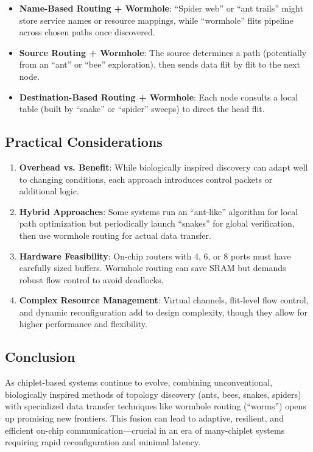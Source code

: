 \documentclass[../OAE-SPEC-MAIN.tex]{subfiles}
\begin{document}
\begin{itemize}
    \item \textbf{Name-Based Routing + Wormhole}: “Spider web” or “ant trails” might store service names or resource mappings, while “wormhole” flits pipeline across chosen paths once discovered.
    \item \textbf{Source Routing + Wormhole}: The source determines a path (potentially from an “ant” or “bee” exploration), then sends data flit by flit to the next node.
    \item \textbf{Destination-Based Routing + Wormhole}: Each node consults a local table (built by “snake” or “spider” sweeps) to direct the head flit.
\end{itemize}

\subsection*{Practical Considerations}
\begin{enumerate}
    \item \textbf{Overhead vs. Benefit}: While biologically inspired discovery can adapt well to changing conditions, each approach introduces control packets or additional logic.
    \item \textbf{Hybrid Approaches}: Some systems run an “ant-like” algorithm for local path optimization but periodically launch “snakes” for global verification, then use wormhole routing for actual data transfer.
    \item \textbf{Hardware Feasibility}: On-chip routers with 4, 6, or 8 ports must have carefully sized buffers. Wormhole routing can save SRAM but demands robust flow control to avoid deadlocks.
    \item \textbf{Complex Resource Management}: Virtual channels, flit-level flow control, and dynamic reconfiguration add to design complexity, though they allow for higher performance and flexibility.
\end{enumerate}

\subsection*{Conclusion}

As chiplet-based systems continue to evolve, combining unconventional, biologically inspired methods of topology discovery (ants, bees, snakes, spiders) with specialized data transfer techniques like wormhole routing (“worms”) opens up promising new frontiers. This fusion can lead to adaptive, resilient, and efficient on-chip communication—crucial in an era of many-chiplet systems requiring rapid reconfiguration and minimal latency.
\end{document}
